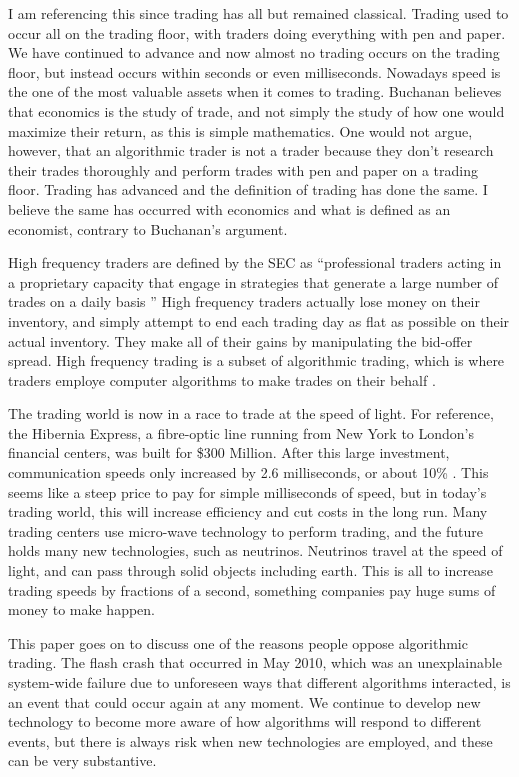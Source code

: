 \documentclass[11pt,]{article}
\begin{document}
I am referencing this since trading has all but remained classical.
Trading used to occur all on the trading floor, with traders doing
everything with pen and paper. We have continued to advance and now
almost no trading occurs on the trading floor, but instead occurs within
seconds or even milliseconds. Nowadays speed is the one of the most
valuable assets when it comes to trading. Buchanan believes that
economics is the study of trade, and not simply the study of how one
would maximize their return, as this is simple mathematics. One would
not argue, however, that an algorithmic trader is not a trader because
they don't research their trades thoroughly and perform trades with pen
and paper on a trading floor. Trading has advanced and the definition of
trading has done the same. I believe the same has occurred with
economics and what is defined as an economist, contrary to Buchanan's
argument.

High frequency traders are defined by the SEC as ``professional traders
acting in a proprietary capacity that engage in strategies that generate
a large number of trades on a daily basis \citet{menkveld2013high}''
High frequency traders actually lose money on their inventory, and
simply attempt to end each trading day as flat as possible on their
actual inventory. They make all of their gains by manipulating the
bid-offer spread. High frequency trading is a subset of algorithmic
trading, which is where traders employe computer algorithms to make
trades on their behalf \citet{zhang2010high}.

The trading world is now in a race to trade at the speed of light. For
reference, the Hibernia Express, a fibre-optic line running from New
York to London's financial centers, was built for \$300 Million. After
this large investment, communication speeds only increased by 2.6
milliseconds, or about 10\% \citet{buchanan2015trading}. This seems like
a steep price to pay for simple milliseconds of speed, but in today's
trading world, this will increase efficiency and cut costs in the long
run. Many trading centers use micro-wave technology to perform trading,
and the future holds many new technologies, such as neutrinos. Neutrinos
travel at the speed of light, and can pass through solid objects
including earth. This is all to increase trading speeds by fractions of
a second, something companies pay huge sums of money to make happen.

This paper goes on to discuss one of the reasons people oppose
algorithmic trading. The flash crash that occurred in May 2010, which
was an unexplainable system-wide failure due to unforeseen ways that
different algorithms interacted, is an event that could occur again at
any moment. We continue to develop new technology to become more aware
of how algorithms will respond to different events, but there is always
risk when new technologies are employed, and these can be very
substantive.
\end{document}
